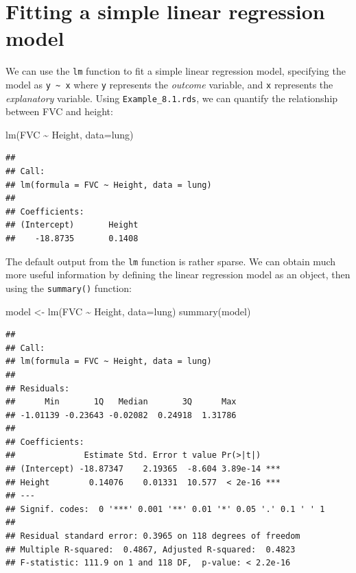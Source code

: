 \documentclass[
]{memoir}
\newenvironment{Shaded}{\begin{snugshade}}{\end{snugshade}}
\newcommand{\AttributeTok}[1]{\textcolor[rgb]{0.77,0.63,0.00}{#1}}
\newcommand{\FunctionTok}[1]{\textcolor[rgb]{0.00,0.00,0.00}{#1}}
\newcommand{\NormalTok}[1]{#1}
\newcommand{\OtherTok}[1]{\textcolor[rgb]{0.56,0.35,0.01}{#1}}
\newcommand{\SpecialCharTok}[1]{\textcolor[rgb]{0.00,0.00,0.00}{#1}}
\begin{document}
\hypertarget{fitting-a-simple-linear-regression-model-1}{%
\section{Fitting a simple linear regression model}\label{fitting-a-simple-linear-regression-model-1}}

We can use the \texttt{lm} function to fit a simple linear regression model, specifying the model as \texttt{y\ \textasciitilde{}\ x} where \texttt{y} represents the \emph{outcome} variable, and \texttt{x} represents the \emph{explanatory} variable. Using \texttt{Example\_8.1.rds}, we can quantify the relationship between FVC and height:

\begin{Shaded}
\begin{Highlighting}[]
\FunctionTok{lm}\NormalTok{(FVC }\SpecialCharTok{\textasciitilde{}}\NormalTok{ Height, }\AttributeTok{data=}\NormalTok{lung)}
\end{Highlighting}
\end{Shaded}

\begin{verbatim}
## 
## Call:
## lm(formula = FVC ~ Height, data = lung)
## 
## Coefficients:
## (Intercept)       Height  
##    -18.8735       0.1408
\end{verbatim}

The default output from the \texttt{lm} function is rather sparse. We can obtain much more useful information by defining the linear regression model as an object, then using the \texttt{summary()} function:

\begin{Shaded}
\begin{Highlighting}[]
\NormalTok{model }\OtherTok{\textless{}{-}} \FunctionTok{lm}\NormalTok{(FVC }\SpecialCharTok{\textasciitilde{}}\NormalTok{ Height, }\AttributeTok{data=}\NormalTok{lung)}
\FunctionTok{summary}\NormalTok{(model)}
\end{Highlighting}
\end{Shaded}

\begin{verbatim}
## 
## Call:
## lm(formula = FVC ~ Height, data = lung)
## 
## Residuals:
##      Min       1Q   Median       3Q      Max 
## -1.01139 -0.23643 -0.02082  0.24918  1.31786 
## 
## Coefficients:
##              Estimate Std. Error t value Pr(>|t|)    
## (Intercept) -18.87347    2.19365  -8.604 3.89e-14 ***
## Height        0.14076    0.01331  10.577  < 2e-16 ***
## ---
## Signif. codes:  0 '***' 0.001 '**' 0.01 '*' 0.05 '.' 0.1 ' ' 1
## 
## Residual standard error: 0.3965 on 118 degrees of freedom
## Multiple R-squared:  0.4867, Adjusted R-squared:  0.4823 
## F-statistic: 111.9 on 1 and 118 DF,  p-value: < 2.2e-16
\end{verbatim}
\end{document}
